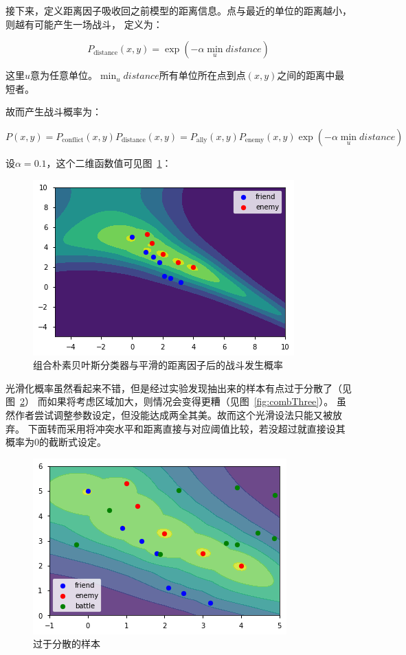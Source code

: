 \documentclass{sicnuthesis}
\begin{document}
接下来，定义距离因子吸收回之前模型的距离信息。点与最近的单位的距离越小，则越有可能产生一场战斗，
定义为：

$$
P_{\text{distance}}(x,y) = \exp(-\alpha \min_{u} distance)
$$


这里$u$意为任意单位。$\min_u distance$所有单位所在点到点$(x,y)$之间的距离中最短者。

故而产生战斗概率为：

$$
P(x,y) = P_{\text{conflict}}(x,y) P_{\text{distance}}(x,y) = 
P_\text{ally}(x,y) P_\text{enemy}(x,y) \exp(-\alpha \min_{u} distance)
$$


设$\alpha=0.1$，这个二维函数值可见图~\ref{fig:combOne}：

\begin{figure}[htb]
\includegraphics[width=0.6\linewidth]{comb1.png}
\caption{
组合朴素贝叶斯分类器与平滑的距离因子后的战斗发生概率}
\label{fig:combOne}
\end{figure}

光滑化概率虽然看起来不错，但是经过实验发现抽出来的样本有点过于分散了（见图~\ref{fig:combTwo}）
而如果将考虑区域加大，则情况会变得更糟（见图~\ref{fig:combThree}）。
虽然作者尝试调整参数设定，但没能达成两全其美。故而这个光滑设法只能又被放弃。
下面转而采用将冲突水平和距离直接与对应阈值比较，若没超过就直接设其概率为0的截断式设定。

\begin{figure}[htb]
\includegraphics[width=0.6\linewidth]{comb2.png}
\caption{过于分散的样本}
\label{fig:combTwo}
\end{figure}
\end{document}
